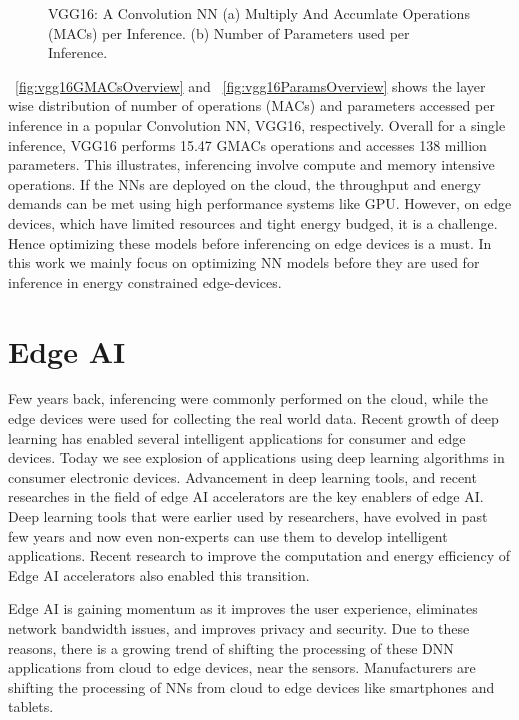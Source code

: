 \begin{figure}[!htb]
	\centering
	\captionsetup{font=sf}
	\hfil
	\caption{VGG16: A Convolution NN (a) Multiply And Accumlate Operations (MACs) per Inference. (b) Number of Parameters used per Inference.}
	\label{fig:MACAndParamsSize}
\end{figure}
\figurename{~\ref{fig:vgg16GMACsOverview}} and \figurename{~\ref{fig:vgg16ParamsOverview}} shows the layer wise distribution of number of operations (MACs) and parameters accessed per inference in a popular Convolution NN, VGG16, respectively. Overall for a single inference, VGG16 performs 15.47 GMACs operations and accesses 138 million parameters. This illustrates, inferencing involve compute and memory intensive operations. If the NNs are deployed on the cloud, the throughput and energy demands can be met using high performance systems like GPU. However, on edge devices, which have limited resources and tight energy budged, it is a challenge. Hence optimizing these models before inferencing on edge devices is a must. In this work we mainly focus on optimizing NN models before they are used for inference in energy constrained edge-devices.

\section{Edge AI}
Few years back, inferencing were commonly performed on the cloud, while the edge devices were used for collecting the real world data. Recent growth of deep learning has enabled several intelligent applications for consumer and edge devices. Today we see explosion of applications using deep learning algorithms in consumer electronic devices. Advancement in deep learning tools, and recent researches in the field of edge AI accelerators are the key enablers of edge AI. Deep learning tools that were earlier used by researchers, have evolved in past few years and now even non-experts can use them to develop intelligent applications. Recent research to improve the computation and energy efficiency of Edge AI accelerators also enabled this transition. 

Edge AI is gaining momentum as it improves the user experience, eliminates network bandwidth issues, and improves privacy and security. Due to these reasons, there is a growing trend of shifting the processing of these DNN applications from cloud to edge devices, near the sensors. Manufacturers are shifting the processing of NNs from cloud to edge devices like smartphones and tablets. 

